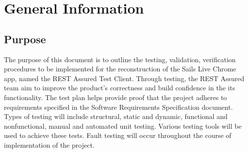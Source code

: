 %
%

\section{General Information}
	
\subsection{Purpose}
The purpose of this document is to outline the testing, validation, verification procedures to be implemented for the reconstruction of the Sails Live Chrome app, named the REST Assured Test Client. Through testing, the REST Assured team aim to improve the product’s correctness and build confidence in the its functionality. The test plan helps provide proof that the project adheres to requirements specified in the Software Requirements Specification document. 
Types of testing will include structural, static and dynamic, functional and nonfunctional, manual and automated unit testing. Various testing tools will be used to achieve these tests. Fault testing will occur throughout the course of implementation of the project.

